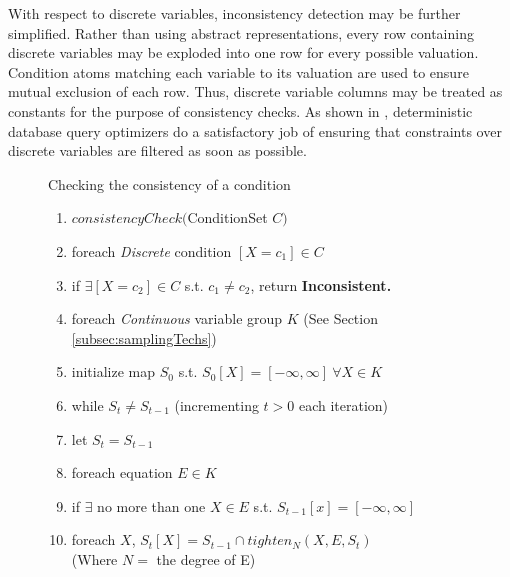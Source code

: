With  respect to discrete variables, inconsistency detection may be further simplified.  Rather than using abstract representations, every row containing discrete variables may be exploded into one row for every possible valuation.  Condition atoms matching each variable to its valuation are used to ensure mutual exclusion of each row.  Thus, discrete variable columns may be treated as constants for the purpose of consistency checks.  As shown in \cite{AJKO2008}, deterministic database query optimizers do a satisfactory job of ensuring that constraints over discrete variables are filtered as soon as possible.

\begin{figure}
\begin{algorithm} Checking the consistency of a condition
\label{alg:consistCheck}
\footnotesize
\begin{enumerate}
\item $consistencyCheck($ConditionSet $C)$
\item \hspace*{0.1in} foreach \textit{Discrete} condition $[X = c_1] \in C$
\item \hspace*{0.2in} if $\exists [X = c_2] \in C$ s.t. $c_1 \neq c_2$, return \textbf{Inconsistent.}
\item \hspace*{0.1in} foreach \textit{Continuous} variable group $K$ (See Section \ref{subsec:samplingTechs})
\item \hspace*{0.2in} initialize map $S_0$ s.t. $S_0[X] = [-\infty,\infty]\ \forall X \in K$
\item \hspace*{0.2in} while $S_{t} \neq S_{t-1}$ (incrementing $t>0$ each iteration)
\item \hspace*{0.3in} let $S_{t} = S_{t-1}$
\item \hspace*{0.3in} foreach equation $E \in K$
\item \hspace*{0.4in} if $\exists$ no more than one $X\in E$ s.t. $S_{t-1}[x] = [-\infty,\infty]$
\item \hspace*{0.5in} foreach $X$, $S_{t}[X] = S_{t-1} \cap tighten_N(X,E,S_{t})$\\ \hspace*{0.7in} (Where $N = $ the degree of E)

\end{enumerate}
\end{algorithm}
\end{figure}
